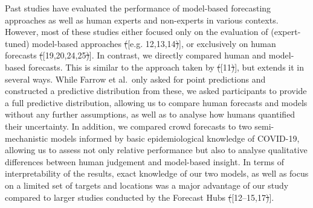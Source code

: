 \documentclass[10pt,letterpaper]{article} %
\providecommand{\DIFdeltex}[1]{{\protect\color{red}\sout{#1}}}                      %
\providecommand{\DIFaddbegin}{} %
\providecommand{\DIFaddend}{} %
\providecommand{\DIFdelbegin}{} %
\providecommand{\DIFdelend}{} %
\providecommand{\DIFdel}[1]{\texorpdfstring{\DIFdeltex{#1}}{}} %
\newcommand{\DIFscaledelfig}{0.5}
\newlength{\DIFdelgraphicswidth} %
\newlength{\DIFdelgraphicsheight} %
\newcommand{\DIFaddincludegraphics}[2][]{{\color{blue}\fbox{\DIFOincludegraphics[#1]{#2}}}} %
\newcommand{\DIFdelincludegraphics}[2][]{%
\sbox{\DIFdelgraphicsbox}{\DIFOincludegraphics[#1]{#2}}%
\settoboxwidth{\DIFdelgraphicswidth}{\DIFdelgraphicsbox} %
\settoboxtotalheight{\DIFdelgraphicsheight}{\DIFdelgraphicsbox} %
\scalebox{\DIFscaledelfig}{%
\parbox[b]{\DIFdelgraphicswidth}{\usebox{\DIFdelgraphicsbox}\\[-\baselineskip] \rule{\DIFdelgraphicswidth}{0em}}\llap{\resizebox{\DIFdelgraphicswidth}{\DIFdelgraphicsheight}{%
\setlength{\unitlength}{\DIFdelgraphicswidth}%
\begin{picture}(1,1)%
\thicklines\linethickness{2pt} %
{\color[rgb]{1,0,0}\put(0,0){\framebox(1,1){}}}%
{\color[rgb]{1,0,0}\put(0,0){\line( 1,1){1}}}%
{\color[rgb]{1,0,0}\put(0,1){\line(1,-1){1}}}%
\end{picture}%
}\hspace*{3pt}}} %
} %
\DeclareRobustCommand{\DIFaddbegin}{\DIFOaddbegin \let\includegraphics\DIFaddincludegraphics} %
\DeclareRobustCommand{\DIFaddend}{\DIFOaddend \let\includegraphics\DIFOincludegraphics} %
\DeclareRobustCommand{\DIFdelbegin}{\DIFOdelbegin \let\includegraphics\DIFdelincludegraphics} %
\DeclareRobustCommand{\DIFdelend}{\DIFOaddend \let\includegraphics\DIFOincludegraphics} %
\begin{document}
Past studies have evaluated the performance of model-based forecasting
approaches as well as human experts and non-experts in various contexts.
However, most of these studies either focused only on the evaluation of
(expert-tuned) model-based approaches \DIFdelbegin \DIFdel{(}\DIFdelend \DIFaddbegin {[}\DIFaddend e.g. 12,13,14\DIFdelbegin \DIFdel{)}\DIFdelend \DIFaddbegin {]}\DIFaddend , or
exclusively on human forecasts \DIFdelbegin \DIFdel{(}\DIFdelend \DIFaddbegin {[}\DIFaddend 19,20,24,25\DIFdelbegin \DIFdel{)}\DIFdelend \DIFaddbegin {]}\DIFaddend . In contrast, we
directly compared human and model-based forecasts. This is similar to
the approach taken by \DIFdelbegin \DIFdel{(}\DIFdelend \DIFaddbegin {[}\DIFaddend 11\DIFdelbegin \DIFdel{)}\DIFdelend \DIFaddbegin {]}\DIFaddend , but extends it in several ways. While
Farrow et al.~only asked for point predictions and constructed a
predictive distribution from these, we asked participants to provide a
full predictive distribution, allowing us to compare human forecasts and
models without any further assumptions, as well as to analyse how humans
quantified their uncertainty. In addition, we compared crowd forecasts
to two semi-mechanistic models informed by basic epidemiological
knowledge of COVID-19, allowing us to assess not only relative
performance but also to analyse qualitative differences between human
judgement and model-based insight. In terms of interpretability of the
results, exact knowledge of our two models, as well as focus on a
limited set of targets and locations was a major advantage of our study
compared to larger studies conducted by the Forecast Hubs
\DIFdelbegin \DIFdel{(}\DIFdelend \DIFaddbegin {[}\DIFaddend 12--15,17\DIFdelbegin \DIFdel{)}\DIFdelend \DIFaddbegin {]}\DIFaddend .
\end{document}
